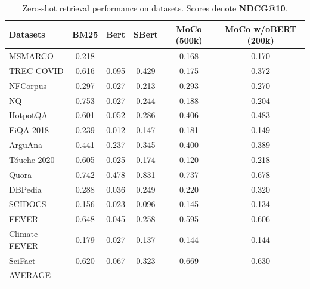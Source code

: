 \begin{table}[t!]
    \centering
    \begin{tabular}{l | c c c c c}
        \toprule
        Datasets & BM25 & Bert & SBert & MoCo (500k) & MoCo w/oBERT (200k) \\
        \midrule
   MSMARCO       & 0.218 & & & 0.168 & 0.170 \\ \midrule
   TREC-COVID    & 0.616 & 0.095 & 0.429 & 0.175 & 0.372 \\
   NFCorpus      & 0.297 & 0.027 & 0.213 & 0.293 & 0.270 \\ \midrule
   NQ            & 0.753 & 0.027 & 0.244 & 0.188 & 0.204 \\ 
   HotpotQA      & 0.601 & 0.052 & 0.286 & 0.406 & 0.483 \\ 
   FiQA-2018     & 0.239 & 0.012 & 0.147 & 0.181 & 0.149 \\ \midrule
   ArguAna       & 0.441 & 0.237 & 0.345 & 0.400 & 0.389 \\
   T\'ouche-2020 & 0.605 & 0.025 & 0.174 & 0.120 & 0.218 \\ \midrule 
   Quora         & 0.742 & 0.478 & 0.831 & 0.737 & 0.678 \\ \midrule
   DBPedia       & 0.288 & 0.036 & 0.249 & 0.220 & 0.320 \\ \midrule
   SCIDOCS       & 0.156 & 0.023 & 0.096 & 0.145 & 0.134 \\ \midrule
   FEVER         & 0.648 & 0.045 & 0.258 & 0.595 & 0.606 \\ 
   Climate-FEVER & 0.179 & 0.027 & 0.137 & 0.144 & 0.144 \\ 
   SciFact       & 0.620 & 0.067 & 0.323 & 0.669 & 0.630 \\ \midrule
   AVERAGE       &  \\ 
        \bottomrule
    \end{tabular}
    \caption{Zero-shot retrieval performance on \beir datasets. Scores denote \textbf{NDCG@10}.}
    \label{tab:results-recall}
\end{table}


